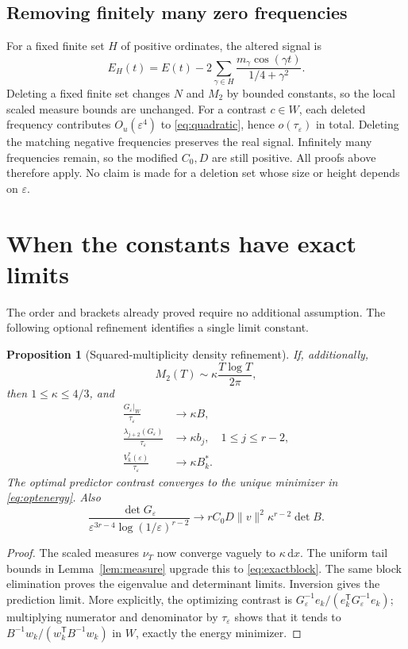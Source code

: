 \documentclass[11pt]{article}
\newtheorem{proposition}[theorem]{Proposition}
\theoremstyle{definition}\newtheorem{definition}[theorem]{Definition}
\theoremstyle{remark}\newtheorem{remark}[theorem]{Remark}
\newcommand{\dd}{\,\mathrm d}
\newcommand{\eps}{\varepsilon}
\newcommand{\tr}{\mathsf T}
\newcommand{\tauE}{\tau_\eps}
\begin{document}
\subsection{Removing finitely many zero frequencies}
For a fixed finite set $H$ of positive ordinates, the altered signal is
\[
 E_H(t)=E(t)-2\sum_{\gamma\in H}
          \frac{m_\gamma\cos(\gamma t)}{1/4+\gamma^2}.
\]
Deleting a fixed finite set changes $N$ and $M_2$ by bounded constants,
so the local scaled measure bounds are unchanged. For a contrast
$c\in W$, each deleted frequency contributes $O_u(\eps^4)$ to
\eqref{eq:quadratic}, hence $o(\tauE)$ in total. Deleting the matching
negative frequencies preserves the real signal. Infinitely many
frequencies remain, so the modified $C_0,D$ are still positive.
All proofs above therefore apply. No claim is made for a deletion set
whose size or height depends on $\eps$.

\section{When the constants have exact limits}\label{sec:exact}
The order and brackets already proved require no additional
assumption. The following optional refinement identifies a single
limit constant.

\begin{proposition}[Squared-multiplicity density refinement]\label{prop:kappa}
If, additionally,
\begin{equation}\label{eq:kappa}
 M_2(T)\sim\kappa\frac{T\log T}{2\pi},
\end{equation}
then $1\le\kappa\le4/3$, and
\begin{align}
 \frac{G_\eps|_W}{\tauE}&\longrightarrow\kappa B,\label{eq:exactblock}\\
 \frac{\lambda_{j+2}(G_\eps)}{\tauE}&\longrightarrow\kappa b_j,
       \quad 1\le j\le r-2,\\
 \frac{V_k^*(\eps)}{\tauE}&\longrightarrow\kappa B_k^*.
\end{align}
The optimal predictor contrast converges to the unique minimizer in
\eqref{eq:optenergy}. Also
\[
 \frac{\det G_\eps}{\eps^{3r-4}\log(1/\eps)^{r-2}}
 \longrightarrow rC_0D\|v\|^2\kappa^{r-2}\det B.
\]
\end{proposition}
\begin{proof}
The scaled measures $\nu_T$ now converge vaguely to $\kappa\dd x$.
The uniform tail bounds in Lemma~\ref{lem:measure} upgrade this to
\eqref{eq:exactblock}. The same block elimination proves the eigenvalue
and determinant limits. Inversion gives the prediction limit. More
explicitly, the optimizing contrast is
$G_\eps^{-1}e_k/(e_k^\tr G_\eps^{-1}e_k)$; multiplying numerator and
denominator by $\tauE$ shows that it tends to
$B^{-1}w_k/(w_k^\tr B^{-1}w_k)$ in $W$, exactly the energy minimizer.
\end{proof}
\end{document}
